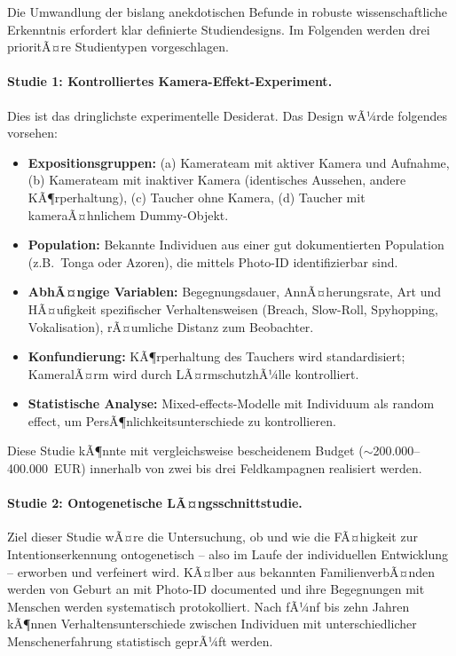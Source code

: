 ﻿\documentclass[12pt,a4paper]{article}
\theoremstyle{definition}
\theoremstyle{remark}
\begin{document}
Die Umwandlung der bislang anekdotischen Befunde in robuste wissenschaftliche Erkenntnis erfordert klar definierte Studiendesigns. Im Folgenden werden drei prioritÃ¤re Studientypen vorgeschlagen.

\paragraph{Studie 1: Kontrolliertes Kamera-Effekt-Experiment.}
Dies ist das dringlichste experimentelle Desiderat. Das Design wÃ¼rde folgendes vorsehen:

\begin{itemize}
  \item \textbf{Expositionsgruppen:} (a) Kamerateam mit aktiver Kamera und Aufnahme,
        (b) Kamerateam mit inaktiver Kamera (identisches Aussehen, andere KÃ¶rperhaltung),
        (c) Taucher ohne Kamera, (d) Taucher mit kameraÃ¤hnlichem Dummy-Objekt.
  \item \textbf{Population:} Bekannte Individuen aus einer gut dokumentierten
        Population (z.B.\ Tonga oder Azoren), die mittels Photo-ID identifizierbar sind.
  \item \textbf{AbhÃ¤ngige Variablen:} Begegnungsdauer, AnnÃ¤herungsrate, Art und
        HÃ¤ufigkeit spezifischer Verhaltensweisen (Breach, Slow-Roll, Spyhopping,
        Vokalisation), rÃ¤umliche Distanz zum Beobachter.
  \item \textbf{Konfundierung:} KÃ¶rperhaltung des Tauchers wird standardisiert;
        KameralÃ¤rm wird durch LÃ¤rmschutzhÃ¼lle kontrolliert.
  \item \textbf{Statistische Analyse:} Mixed-effects-Modelle mit Individuum als
        random effect, um PersÃ¶nlichkeitsunterschiede zu kontrollieren.
\end{itemize}

Diese Studie kÃ¶nnte mit vergleichsweise bescheidenem Budget ($\sim$200.000--400.000~EUR) innerhalb von zwei bis drei Feldkampagnen realisiert werden.

\paragraph{Studie 2: Ontogenetische LÃ¤ngsschnittstudie.}
Ziel dieser Studie wÃ¤re die Untersuchung, ob und wie die FÃ¤higkeit zur Intentionserkennung ontogenetisch -- also im Laufe der individuellen Entwicklung -- erworben und verfeinert wird. KÃ¤lber aus bekannten FamilienverbÃ¤nden werden von Geburt an mit Photo-ID documented und ihre Begegnungen mit Menschen werden systematisch protokolliert. Nach fÃ¼nf bis zehn Jahren kÃ¶nnen Verhaltensunterschiede zwischen Individuen mit unterschiedlicher Menschenerfahrung statistisch geprÃ¼ft werden.
\end{document}
